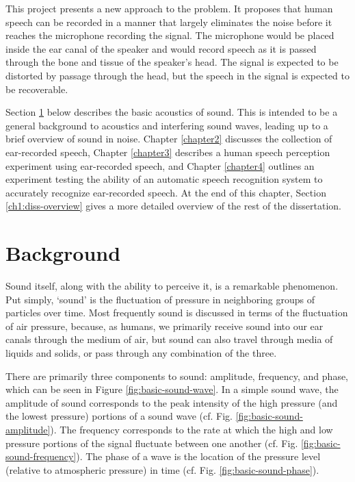 \DIFaddend This project presents a new approach to the problem.  It proposes that human speech can be recorded in a manner that largely eliminates the noise before it reaches the microphone recording the signal.  The microphone would be placed inside the ear canal of the speaker and would record speech as it is passed through the bone and tissue of the speaker's head.  The signal is expected to be distorted by passage through the head, but the speech in the signal is expected to be recoverable.

Section \ref{ch1:background} below describes the basic acoustics of sound.  This is intended to be a general background to acoustics and interfering sound waves, leading up to a brief overview of sound in noise. Chapter \ref{chapter2} discusses the collection of ear-recorded speech, Chapter \ref{chapter3} describes a human speech perception experiment using ear-recorded speech, and Chapter \ref{chapter4} outlines an experiment testing the ability of an automatic speech recognition system to accurately recognize ear-recorded speech.  At the end of this chapter, Section \ref{ch1:diss-overview} gives a more detailed overview of the rest of the dissertation.

\section{Background}\label{ch1:background}

Sound itself, along with the ability to perceive it, is a remarkable phenomenon.  Put simply, `sound' is the fluctuation of pressure in neighboring groups of particles over time. Most frequently sound is discussed in terms of the fluctuation of air pressure, because, as humans, we primarily receive sound into our ear canals through the medium of air, but sound can also travel through media of liquids and solids, or pass through any combination of the three.

There are primarily three components to sound: amplitude, frequency, and phase, which can be seen in Figure \ref{fig:basic-sound-wave}.  In a simple sound wave, the amplitude of sound corresponds to the peak intensity of the high pressure (and the lowest pressure) portions of a sound wave (cf. Fig. \ref{fig:basic-sound-amplitude}).  The frequency corresponds to the rate at which the high and low pressure portions of the signal fluctuate between one another (cf. Fig. \ref{fig:basic-sound-frequency}).  The phase of a wave is the location of the pressure level (relative to atmospheric pressure) in time (cf. Fig. \ref{fig:basic-sound-phase}).   

